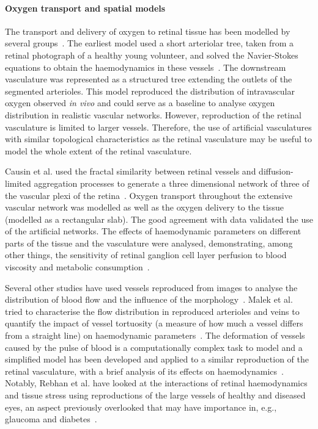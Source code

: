 \documentclass{article}
\begin{document}
\paragraph*{Oxygen transport and spatial models}

The transport and delivery of oxygen to retinal tissue has been modelled by several groups~\cite{Aquah_et_al_2021,Causin_2015,Liu_2009}.
The earliest model used a short arteriolar tree, taken from a retinal photograph of a healthy young volunteer, and solved the Navier-Stokes equations to obtain the haemodynamics in these vessels~\cite{Liu_2009}.
The downstream vasculature was represented as a structured tree extending the outlets of the segmented arterioles.
This model reproduced the distribution of intravascular oxygen observed \textit{in vivo} and could serve as a baseline to analyse oxygen distribution in realistic vascular networks.
However, reproduction of the retinal vasculature is limited to larger vessels.
Therefore, the use of artificial vasculatures with similar topological characteristics as the retinal vasculature may be useful to model the whole extent of the retinal vasculature.

Causin et al. used the fractal similarity between retinal vessels and diffusion-limited aggregation processes to generate a three dimensional network of three of the vascular plexi of the retina~\cite{Causin_2015}.
Oxygen transport throughout the extensive vascular network was modelled as well as the oxygen delivery to the tissue (modelled as a rectangular slab).
The good agreement with data validated the use of the artificial networks.
The effects of haemodynamic parameters on different parts of the tissue and the vasculature were analysed, demonstrating, among other things, the sensitivity of retinal ganglion cell layer perfusion to blood viscosity and metabolic consumption~\cite{Causin_2015}.


Several other studies have used vessels reproduced from images to analyse the distribution of blood flow and the influence of the morphology~\cite{Malek_2014,Malek_2015,Rebhan_2019}.
Malek et al. tried to characterise the flow distribution in reproduced arterioles and veins to quantify the impact of vessel tortuosity (a measure of how much a vessel differs from a straight line) on haemodynamic parameters~\cite{Malek_2014,Malek_2015}.
The deformation of vessels caused by the pulse of blood is a computationally complex task to model and a simplified model has been developed and applied to a similar reproduction of the retinal vasculature, with a brief analysis of its effects on haemodynamics~\cite{Aletti_2016}.
Notably, Rebhan et al. have looked at the interactions of retinal haemodynamics and tissue stress using reproductions of the large vessels of healthy and diseased eyes, an aspect previously overlooked that may have importance in, e.g., glaucoma and diabetes~\cite{Rebhan_2019}.
\end{document}
